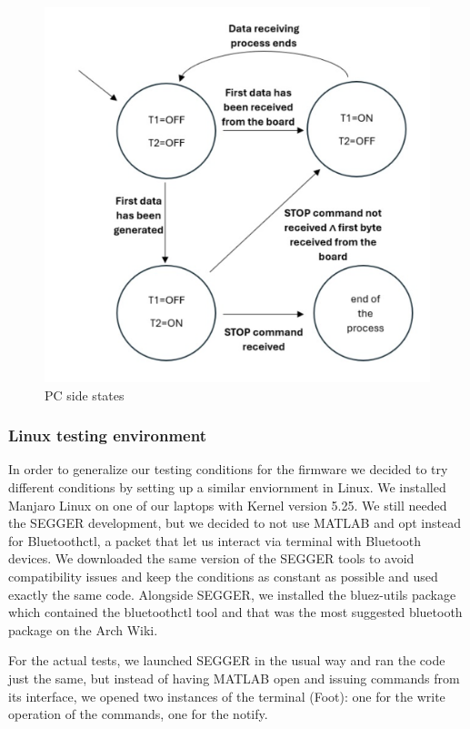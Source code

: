 \documentclass{Configuration_Files/PoliMi3i_thesis}
\begin{document}
\begin{figure}[H]
    \centering
    \includegraphics[scale=0.5]{Board Windows PC/Screenshot 2024-09-15 at 18.19.54.png}
    \caption{PC side states}
    \label{fboardwindows_11}
\end{figure}

\subsubsection{Linux testing environment}

In order to generalize our testing conditions for the firmware we decided to try different conditions by setting up a similar enviornment in Linux.
We installed Manjaro Linux on one of our laptops with Kernel version 5.25.
We still needed the SEGGER development, but we decided to not use MATLAB and opt instead for Bluetoothctl, a packet that let us interact via terminal with Bluetooth devices.
We downloaded the same version of the SEGGER tools to avoid compatibility issues and keep the conditions as constant as possible and used exactly the same code.
Alongside SEGGER, we installed the bluez-utils package which contained the bluetoothctl tool and that was the most suggested bluetooth package on the Arch Wiki.

For the actual tests, we launched SEGGER in the usual way and ran the code just the same, but instead of having MATLAB open and issuing commands from its interface, we opened two instances of the terminal (Foot): one for the write operation of the commands, one for the notify.
\end{document}
